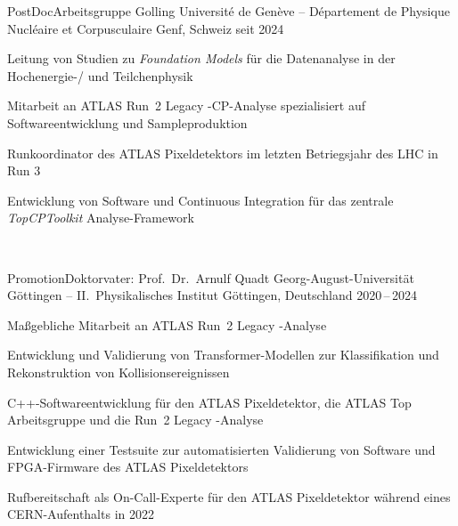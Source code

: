 %
\begin{cventries}%
  \cventry%
    {PostDoc{\enskip\cdotp\enskip}Arbeitsgruppe Golling} %
    {Universit\'e de Gen\`eve -- D\'epartement de Physique Nucl\'eaire et Corpusculaire} %
    {Genf, Schweiz} %
    {seit 2024} %
    {%
      \begin{cvitems} %
        \item {%
            Leitung von Studien zu \emph{Foundation Models} f\"ur die Datenanalyse in der Hochenergie-/ und Teilchenphysik%
        }%
        \item {%
            Mitarbeit an ATLAS Run~2 Legacy \ttHbb-CP-Analyse spezialisiert auf Softwareentwicklung und Sampleproduktion
        }%
        \item {%
            Runkoordinator des ATLAS Pixeldetektors im letzten Betriegsjahr des LHC in Run 3%
        }%
        \item {%
            Entwicklung von Software und Continuous Integration für das zentrale \emph{TopCPToolkit} Analyse-Framework%
        }%
      \end{cvitems}%
      ~%
    }%

  \cventry%
    {Promotion{\enskip\cdotp\enskip}Doktorvater: Prof.\ Dr.\ Arnulf Quadt} %
    {Georg-August-Universit\"at G\"ottingen -- II.\ Physikalisches Institut} %
    {G\"ottingen, Deutschland} %
    {2020\,--\,2024} %
    {%
      \begin{cvitems} %
        \item {%
            Ma{\ss}gebliche Mitarbeit an ATLAS Run~2 Legacy \ttHbb-Analyse%
        }%
        \item {%
            Entwicklung und Validierung von Transformer-Modellen zur Klassifikation und Rekonstruktion von Kollisionsereignissen%
        }%
        \item {%
            C++-Softwareentwicklung für den ATLAS Pixeldetektor, die ATLAS Top Arbeitsgruppe und die Run~2 Legacy \ttHbb-Analyse%
        }%
        \item {%
            Entwicklung einer Testsuite zur automatisierten Validierung von Software und FPGA-Firmware des ATLAS Pixeldetektors%
        }%
        \item {%
            Rufbereitschaft als On-Call-Experte für den ATLAS Pixeldetektor w\"ahrend eines CERN-Aufenthalts in 2022
        }%
      \end{cvitems}%
      ~%
    }%


\end{cventries}
